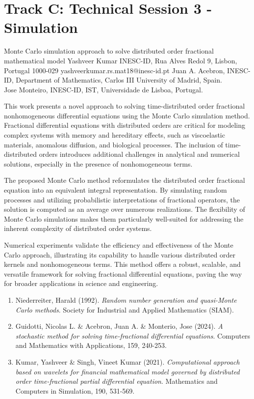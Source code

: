 \section{Track C: Technical Session 3 - Simulation}\newpage

\begin{talk}
  {Monte Carlo simulation approach to solve distributed order fractional mathematical model}%
  {Yashveer Kumar}%
  {INESC-ID, Rua Alves Redol 9, Lisbon, Portugal 1000-029}%
  {yashveerkumar.rs.mat18@inesc-id.pt}%
  {Juan A. Acebron, INESC-ID,  Department of Mathematics, Carlos III University of Madrid, Spain.\\
   Jose Monteiro, INESC-ID, IST, Universidade de Lisboa, Portugal.}%
    
   
   
This work presents a novel approach to solving time-distributed order fractional nonhomogeneous differential equations using the Monte Carlo simulation method. Fractional differential equations with distributed orders are critical for modeling complex systems with memory and hereditary effects, such as viscoelastic materials, anomalous diffusion, and biological processes. The inclusion of time-distributed orders introduces additional challenges in analytical and numerical solutions, especially in the presence of nonhomogeneous terms.

The proposed Monte Carlo method reformulates the distributed order fractional equation into an equivalent integral representation. By simulating random processes and utilizing probabilistic interpretations of fractional operators, the solution is computed as an average over numerous realizations. The flexibility of Monte Carlo simulations makes them particularly well-suited for addressing the inherent complexity of distributed order systems.

Numerical experiments validate the efficiency and effectiveness of the Monte Carlo approach, illustrating its capability to handle various distributed order kernels and nonhomogeneous terms. This method offers a robust, scalable, and versatile framework for solving fractional differential equations, paving the way for broader applications in science and engineering.

\medskip
\begin{enumerate}
 \item[{[1]}] Niederreiter, Harald (1992). {\it Random number generation and quasi-Monte Carlo methods}. Society for Industrial and Applied Mathematics (SIAM).
 \item[{[2]}] Guidotti, Nicolas L. \& Acebron, Juan A.  \&  Monterio, Jose (2024). {\it A stochastic method for solving time-fractional differential equations}. Computers and Mathematics with Applications, 159, 240-253.
 \item[{[3]}] Kumar, Yashveer \& Singh, Vineet Kumar (2021). {\it Computational approach based on wavelets for financial mathematical model governed by distributed order time-fractional partial differential equation}. Mathematics and Computers in Simulation, 190, 531-569.
\end{enumerate}
\end{talk}

